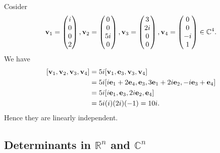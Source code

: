 \documentclass[10pt]{article}
\begin{document}
    \begin{example}
        Cosider 
        \[
            {\bf v}_1=\begin{pmatrix}
                i\\0\\0\\2
            \end{pmatrix},
            {\bf v}_2=\begin{pmatrix}
                0\\0\\5i\\0
            \end{pmatrix},
            {\bf v}_3=\begin{pmatrix}
                3\\2i\\0\\0
            \end{pmatrix},
            {\bf v}_4=\begin{pmatrix}
                0\\0\\-i\\1
            \end{pmatrix}\in \mathbb{C}^{4}
        .\]
        We have 
        \[
            \begin{aligned}
                 [\bfv_1,\bfv_2,\bfv_3,\bfv_4]&=5i[\bfv_1,\bfe_3,\bfv_3,\bfv_4]\\
                 &= 5i[i\bfe_1+2\bfe_4, \bfe_3,3\bfe_1+2i\bfe_2,-i\bfe_3+\bfe_4]\\
                 &= 5i[i\bfe_1,\bfe_3,2i\bfe_2,\bfe_4]\\
                 &= 5i(i)(2i)(-1)=10i.
            \end{aligned}
        \]
        Hence they are linearly independent.
    \end{example}
    \subsection{Determinants in $ \mathbb{R}^{n} $ and $ \mathbb{C}^{n} $}
\end{document}
